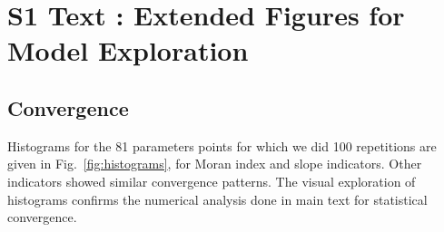 



\section*{S1 Text : Extended Figures for Model Exploration}


\subsection*{Convergence}

Histograms for the 81 parameters points for which we did 100 repetitions are given in Fig.~\ref{fig:histograms}, for Moran index and slope indicators. Other indicators showed similar convergence patterns. The visual exploration of histograms confirms the numerical analysis done in main text for statistical convergence.





